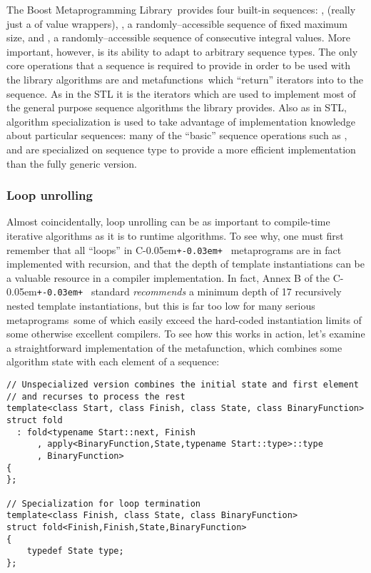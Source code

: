\documentclass{kapproc}
\newcommand{\Cpp}{C\kern-0.05em\texttt{+\kern-0.03em+}%
}
\newcommand{\Mpl}{Boost Meta\-pro\-gram\-ming Library}
\newcommand{\mpgms}{meta\-pro\-grams}
\newcommand{\mfn}{meta\-func\-tion}
\newcommand{\mfns}{meta\-func\-tions}
\begin{document}
The \Mpl\ provides four built-in sequences: ,
 (really just a  of value
wrappers), , a randomly--accessible sequence of
fixed maximum size, and , a randomly--accessible
sequence of consecutive integral values. More important, however, is
its ability to adapt to arbitrary sequence types. The only core
operations that a sequence is required to provide in order to be used
with the library algorithms are  and  \mfns\
which ``return'' iterators into to the sequence. As in the STL it is
the iterators which are used to implement most of the general purpose
sequence algorithms the library provides. Also as in STL, algorithm
specialization is used to take advantage of implementation knowledge
about particular sequences: many of the ``basic'' sequence operations
such as \code{back<>}, \code{front<>} \code{size<>} and \code{at<>}
are specialized on sequence type to provide a more efficient
implementation than the fully generic version.


  \subsubsection{Loop unrolling}

Almost coincidentally, loop unrolling can be as important to
compile-time iterative algorithms as it is to runtime algorithms. To
see why, one must first remember that all ``loops'' in \Cpp\
metaprograms are in fact implemented with recursion, and that the
depth of template instantiations can be a valuable resource in a
compiler implementation. In fact, Annex B of the \Cpp\ standard
\emph{recommends} a minimum depth of 17 recursively nested template
instantiations, but this is far too low for many serious \mpgms\ some
of which easily exceed the hard-coded instantiation limits of some
otherwise excellent compilers. To see how this works in action, let's
examine a straightforward implementation of the \code{fold} \mfn,
which combines some algorithm state with each element of a sequence:

{\small
\begin{codesamp}\begin{verbatim}
// Unspecialized version combines the initial state and first element
// and recurses to process the rest
template<class Start, class Finish, class State, class BinaryFunction>
struct fold
  : fold<typename Start::next, Finish
      , apply<BinaryFunction,State,typename Start::type>::type
      , BinaryFunction>
{
};

// Specialization for loop termination
template<class Finish, class State, class BinaryFunction>
struct fold<Finish,Finish,State,BinaryFunction>
{
    typedef State type;
};
\end{verbatim}
\end{codesamp}
}
\end{document}
